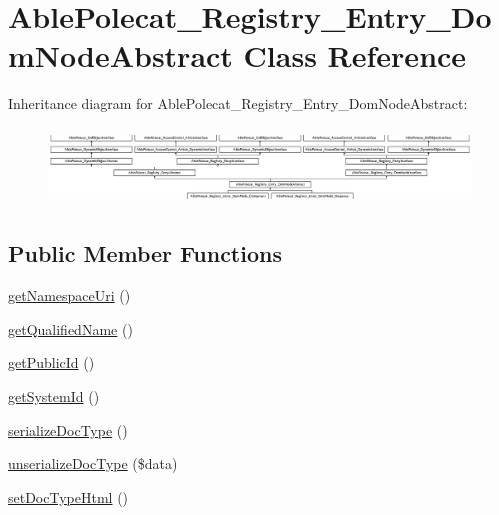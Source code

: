 \hypertarget{class_able_polecat___registry___entry___dom_node_abstract}{}\section{Able\+Polecat\+\_\+\+Registry\+\_\+\+Entry\+\_\+\+Dom\+Node\+Abstract Class Reference}
\label{class_able_polecat___registry___entry___dom_node_abstract}
Inheritance diagram for Able\+Polecat\+\_\+\+Registry\+\_\+\+Entry\+\_\+\+Dom\+Node\+Abstract\+:\begin{figure}[H]
\begin{center}
\leavevmode
\includegraphics[height=2.048780cm]{class_able_polecat___registry___entry___dom_node_abstract}
\end{center}
\end{figure}
\subsection*{Public Member Functions}
\begin{DoxyCompactItemize}
\item 
\hyperlink{class_able_polecat___registry___entry___dom_node_abstract_a88cf6b8ffab972f8db5d3312df206576}{get\+Namespace\+Uri} ()
\item 
\hyperlink{class_able_polecat___registry___entry___dom_node_abstract_ae39fb2f89f278e0702f6a55b616dd855}{get\+Qualified\+Name} ()
\item 
\hyperlink{class_able_polecat___registry___entry___dom_node_abstract_ac02f76ee2955927eb4e4e3324048cdc4}{get\+Public\+Id} ()
\item 
\hyperlink{class_able_polecat___registry___entry___dom_node_abstract_aface5fb500be28f11fe0014e401b806e}{get\+System\+Id} ()
\item 
\hyperlink{class_able_polecat___registry___entry___dom_node_abstract_af2894f245118181699270b3218a86178}{serialize\+Doc\+Type} ()
\item 
\hyperlink{class_able_polecat___registry___entry___dom_node_abstract_aafcf863b2a7a62d48806270ef03a8c2d}{unserialize\+Doc\+Type} (\$data)
\item 
\hyperlink{class_able_polecat___registry___entry___dom_node_abstract_afb2665958fcca4339a1bbf8df2881c7a}{set\+Doc\+Type\+Html} ()
\end{DoxyCompactItemize}
